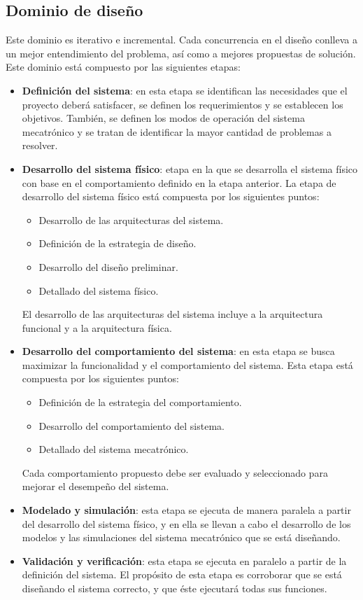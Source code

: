 		\subsection*{Dominio de dise\~{n}o}
\noindent Este dominio es iterativo e incremental. Cada concurrencia en el dise\~{n}o conlleva a un mejor entendimiento del problema, as\'i como a mejores propuestas de soluci\'on. Este dominio est\'a compuesto por las siguientes etapas:

\begin{itemize}
	\item \textbf{Definici\'on del sistema}: en esta etapa se identifican las necesidades que el proyecto deber\'a satisfacer, se definen los requerimientos y se establecen los objetivos. Tambi\'en, se definen los modos de operaci\'on del sistema mecatr\'onico y se tratan de identificar la mayor cantidad de problemas a resolver.
	\item \textbf{Desarrollo del sistema f\'isico}: etapa en la que se desarrolla el sistema f\'isico con base en el comportamiento definido en la etapa anterior. La etapa de desarrollo del sistema f\'isico est\'a compuesta por los siguientes puntos:
		\begin{itemize}
			\item Desarrollo de las arquitecturas del sistema.
			\item Definici\'on de la estrategia de dise\~{n}o.
			\item Desarrollo del dise\~{n}o preliminar.
			\item Detallado del sistema f\'isico.
\end{itemize}
		
El desarrollo de las arquitecturas del sistema incluye a la arquitectura funcional y a la arquitectura f\'isica.
	\item \textbf{Desarrollo del comportamiento del sistema}: en esta etapa se busca maximizar la funcionalidad y el comportamiento del sistema. Esta etapa est\'a compuesta por los siguientes puntos:
		\begin{itemize}
			\item Definici\'on de la estrategia del comportamiento.
			\item Desarrollo del comportamiento del sistema.
			\item Detallado del sistema mecatr\'onico.
		\end{itemize}
Cada comportamiento propuesto debe ser evaluado y seleccionado para mejorar el desempe\~{n}o del sistema.		
	\item \textbf{Modelado y simulaci\'on}: esta etapa se ejecuta de manera paralela a partir del desarrollo del sistema f\'isico, y en ella se llevan a cabo el desarrollo de los modelos y las simulaciones del sistema mecatr\'onico que se est\'a dise\~{n}ando.
	\item \textbf{Validaci\'on y verificaci\'on}: esta etapa se ejecuta en paralelo a partir de la definici\'on del sistema. El prop\'osito de esta etapa es corroborar que se est\'a dise\~{n}ando el sistema correcto, y que \'este ejecutar\'a todas sus funciones.
\end{itemize}

